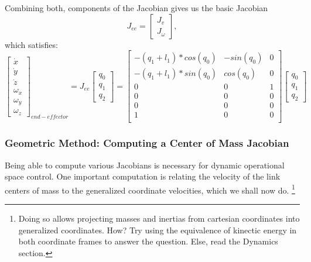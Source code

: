 \documentclass[12pt]{article}
\begin{document}
Combining both, components of the Jacobian gives us the basic Jacobian
\begin{equation}
  J_{ee} = 
  \begin{bmatrix} 
    J_v \\
    J_\omega
  \end{bmatrix},
\end{equation}
which satisfies:
\begin{equation}
  \begin{bmatrix} 
    \dot x \\
    \dot y \\
    \dot z \\
    \omega_x \\
    \omega_y \\
    \omega_z
  \end{bmatrix}_{end-effector}
   = J_{ee} 
  \begin{bmatrix} 
    q_0 \\
    q_1 \\
    q_2
  \end{bmatrix}
   =   
  \begin{bmatrix} 
    -(q_1 + l_1) * cos(q_0) & -sin(q_0) & 0 \\
    -(q_1 + l_1) * sin(q_0) & cos(q_0) & 0 \\ 
    0 & 0 & 1 \\
    0 & 0 & 0 \\
    0 & 0 & 0 \\
    1 & 0 & 0 \\
  \end{bmatrix}
  \begin{bmatrix} 
    q_0 \\
    q_1 \\
    q_2
  \end{bmatrix}
\end{equation}


\subsubsection{Geometric Method: Computing a Center of Mass Jacobian}

Being able to compute various Jacobians is necessary for dynamic operational space control.
One important computation is relating the velocity of the link centers of mass to the 
generalized coordinate velocities, which we shall now do.
\footnote{Doing so allows projecting masses and inertias from cartesian coordinates into
 generalized coordinates. How? Try using the equivalence of kinectic energy in both coordinate
frames to answer the question. Else, read the Dynamics section.}
\end{document}
